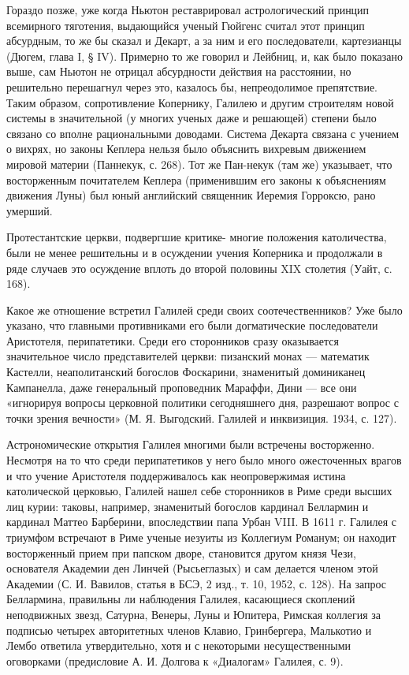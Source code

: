 Гораздо позже, уже когда Ньютон реставрировал астрологический принцип
всемирного тяготения, выдающийся ученый Гюйгенс считал этот принцип абсурдным,
то же бы сказал и Декарт, а за ним и его последователи, картезианцы (Дюгем,
глава I, § IV). Примерно то же говорил и Лейбниц, и, как было показано выше,
сам Ньютон не отрицал абсурдности действия на расстоянии, но решительно
перешагнул через это, казалось бы, непреодолимое препятствие. Таким образом,
сопротивление Копернику, Галилею и другим строителям новой системы в
значительной (у многих ученых даже и решающей) степени было связано со вполне
рациональными доводами. Система Декарта связана с учением о вихрях, но законы
Кеплера нельзя было объяснить вихревым движением мировой материи (Паннекук, с.
268). Тот же Пан-некук (там же) указывает, что восторженным почитателем Кеплера
(применившим его законы к объяснениям движения Луны) был юный английский
священник Иеремия Горроксю, рано умерший.

Протестантские церкви, подвергшие критике- многие положения католичества, были
не менее решительны и в осуждении учения Коперника и продолжали в ряде случаев
это осуждение вплоть до второй половины XIX столетия (Уайт, с. 168).

Какое же отношение встретил Галилей среди своих соотечественников? Уже было
указано, что главными противниками его были догматические последователи
Аристотеля, перипатетики. Среди его сторонников сразу оказывается значительное
число представителей церкви: пизанский монах --- математик Кастелли,
неаполитанский богослов Фоскарини, знаменитый доминиканец Кампанелла, даже
генеральный проповедник Мараффи, Дини --- все они «игнорируя вопросы церковной
политики сегодняшнего дня, разрешают вопрос с точки зрения вечности» (М. Я.
Выгодский. Галилей и инквизиция. 1934, с. 127).

Астрономические открытия Галилея многими были встречены восторженно. Несмотря
на то что среди перипатетиков у него было много ожесточенных врагов и что
учение Аристотеля поддерживалось как неопровержимая истина католической
церковью, Галилей нашел себе сторонников в Риме среди высших лиц курии: таковы,
например, знаменитый богослов кардинал Беллармин и кардинал Маттео Барберини,
впоследствии папа Урбан VIII. В 1611 г. Галилея с триумфом встречают в Риме
ученые иезуиты из Коллегиум Романум; он находит восторженный прием при папском
дворе, становится другом князя Чези, основателя Академии ден Линчей
(Рысьеглазых) и сам делается членом этой Академии (С. И. Вавилов, статья в БСЭ,
2 изд., т. 10, 1952, с. 128). На запрос Беллармина, правильны ли наблюдения
Галилея, касающиеся скоплений неподвижных звезд, Сатурна, Венеры, Луны и
Юпитера, Римская коллегия за подписью четырех авторитетных членов Клавио,
Гринбергера, Малькотио и Лембо ответила утвердительно, хотя и с некоторыми
несущественными оговорками (предисловие А. И. Долгова к «Диалогам» Галилея, с.
9).

